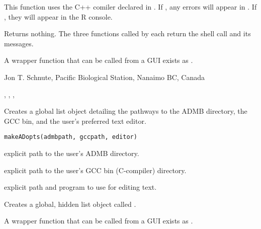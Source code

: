 \documentclass[letterpaper]{book}
\begin{document}
%
\begin{Details}\relax
This function uses the C++ comiler declared in . If ,
any errors will appear in . If ,
they will appear in the R console.
\end{Details}
%
\begin{Value}
Returns nothing. The three functions called by  each 
return the shell call and its messages.
\end{Value}
%
\begin{Note}\relax
A wrapper function that can be called from a GUI exists as .
\end{Note}
%
\begin{Author}\relax
 Jon T. Schnute, Pacific Biological Station, Nanaimo BC, Canada 
\end{Author}
%
\begin{SeeAlso}\relax
 , , ,  
\end{SeeAlso}
%
\begin{Description}\relax
Creates a global list object detailing the pathways to the ADMB directory, the GCC bin, 
and the user's preferred text editor.
\end{Description}
%
\begin{Usage}
\begin{verbatim}
makeADopts(admbpath, gccpath, editor)
\end{verbatim}
\end{Usage}
%
\begin{Arguments}
\begin{ldescription}
\item[\code{admbpath}] explicit path to the user's ADMB directory.
\item[\code{gccpath}] explicit path to the user's GCC bin (C-compiler) directory.
\item[\code{editor}] explicit path and program to use for editing text.
\end{ldescription}
\end{Arguments}
%
\begin{Value}
Creates a global, hidden list object called .
\end{Value}
%
\begin{Note}\relax
A wrapper function that can be called from a GUI exists as .
\end{Note}
\end{document}
